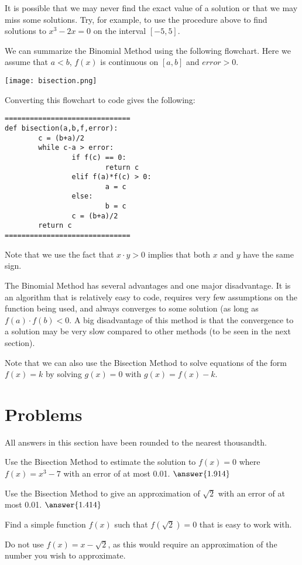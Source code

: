 \documentclass{ximera}
\begin{document}
It is possible that we may never find the exact value of a solution or that we may miss some solutions. Try, for example, to use the procedure above to find solutions to $x^3-2x=0$ on the interval $[-5,5]$.

We can summarize the Binomial Method using the following flowchart. Here we assume that $a<b$, $f(x)$ is continuous on $[a,b]$ and $error>0$.

\begin{center}
	\texttt{[image: bisection.png]}
\end{center}

Converting this flowchart to code gives the following:

\begin{verbatim}
==============================
def bisection(a,b,f,error):
        c = (b+a)/2
        while c-a > error:
                if f(c) == 0:
                        return c
                elif f(a)*f(c) > 0:
                        a = c
                else:
                        b = c
                c = (b+a)/2
        return c
==============================
\end{verbatim}

Note that we use the fact that $x\cdot y>0$ implies that both $x$ and $y$ have the same sign.

The Binomial Method has several advantages and one major disadvantage. It is an algorithm that is relatively easy to code, requires very few assumptions on the function being used, and always converges to some solution (as long as $f(a)\cdot f(b) <0$. A big disadvantage of this method is that the convergence to a solution may be very slow compared to other methods (to be seen in the next section).

Note that we can also use the Bisection Method to solve equations of the form $f(x)=k$ by solving $g(x)=0$ with $g(x)=f(x)-k$.

\section{Problems}

All answers in this section have been rounded to the nearest thousandth.

\begin{question}
	Use the Bisection Method to estimate the solution to $f(x)=0$ where $f(x)=x^3-7$ with an error of at most 0.01. $\answer{1.914}$ 
\end{question}

\begin{question}
	Use the Bisection Method to give an approximation of $\sqrt{2}$ with an error of at most 0.01. $\answer{1.414}$
	\begin{hint}
		Find a simple function $f(x)$ such that $f(\sqrt{2})=0$ that is easy to work with.
	\end{hint}
	\begin{hint}
		Do not use $f(x)=x-\sqrt{2}$, as this would require an approximation of the number you wish to approximate.
	\end{hint}
\end{question}
\end{document}
